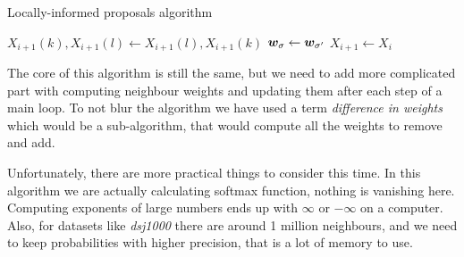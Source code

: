 		\begin{algorithm}
			\caption{Locally-informed proposals algorithm}\label{alg:loc_neigh}
			\begin{algorithmic}[1]
				
					
					
					
								 
							\EndIf
						\EndFor
					\EndFor
					
						\State $X_{i+1}(k), X_{i+1}(l) \gets X_{i+1}(l), X_{i+1}(k)$
						\State $\bm{w}_{\sigma} \gets \bm{w}_{\sigma'}$
					\Else
						\State $X_{i+1} \gets X_i$
					\EndIf
				\EndFor
			\end{algorithmic}
		\end{algorithm}
		The core of this algorithm is still the same, but we need to add more complicated part with computing neighbour weights and updating them after each step of a main loop. To not blur the algorithm we have used a term \textit{difference in weights} which would be a sub-algorithm, that would compute all the weights to remove and add.
		
		Unfortunately, there are more practical things to consider this time. In this algorithm we are actually calculating softmax function, nothing is vanishing here. Computing exponents of large numbers ends up with $\infty$ or $-\infty$ on a computer. Also, for datasets like \textit{dsj1000} there are around 1 million neighbours, and we need to keep probabilities with higher precision, that is a lot of memory to use.
		
